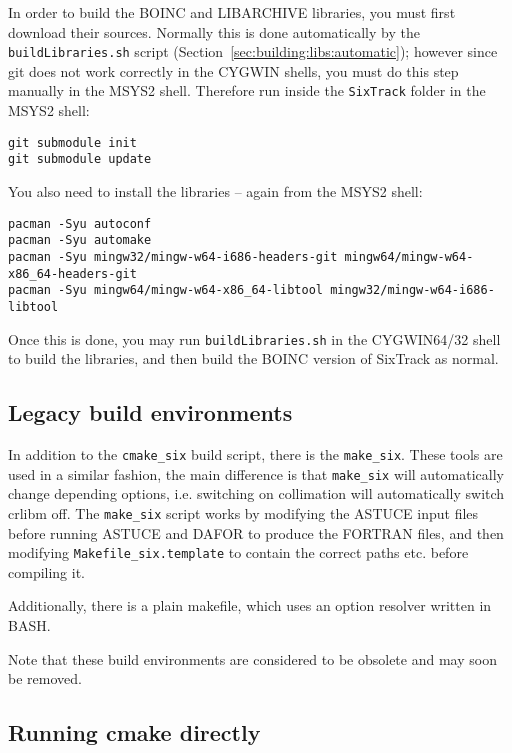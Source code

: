 \documentclass[english,BCOR=0mm,DIV=18]{scrartcl}
\begin{document}
In order to build the BOINC and LIBARCHIVE libraries, you must first download their sources.
Normally this is done automatically by the \texttt{buildLibraries.sh} script (Section~\ref{sec:building:libs:automatic}); however since git does not work correctly in the CYGWIN shells, you must do this step manually in the MSYS2 shell.
Therefore run inside the \texttt{SixTrack} folder in the MSYS2 shell:
\begin{lstlisting}
git submodule init
git submodule update
\end{lstlisting}
You also need to install the libraries -- again from the MSYS2 shell:
\begin{lstlisting}
pacman -Syu autoconf
pacman -Syu automake
pacman -Syu mingw32/mingw-w64-i686-headers-git mingw64/mingw-w64-x86_64-headers-git
pacman -Syu mingw64/mingw-w64-x86_64-libtool mingw32/mingw-w64-i686-libtool
\end{lstlisting}
Once this is done, you may run \texttt{buildLibraries.sh} in the CYGWIN64/32 shell to build the libraries, and then build the BOINC version of SixTrack as normal.


\subsection{Legacy build environments}

In addition to the \texttt{cmake\_six} build script, there is the \texttt{make\_six}.
These tools are used in a similar fashion, the main difference is that \texttt{make\_six} will automatically change depending options, i.e. switching on collimation will automatically switch crlibm off.
The \texttt{make\_six} script works by modifying the ASTUCE input files before running ASTUCE and DAFOR to produce the FORTRAN files, and then modifying \texttt{Makefile\_six.template} to contain the correct paths etc. before compiling it.

Additionally, there is a plain makefile, which uses an option resolver written in BASH.

Note that these build environments are considered to be obsolete and may soon be removed.

\subsection{Running cmake directly}
\end{document}
